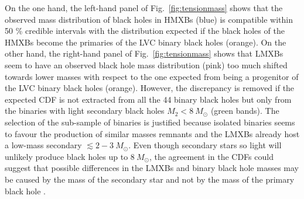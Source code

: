 \documentclass[a4paper,titlepage]{book}     	%
\newcommand{\sun}{\ensuremath{_\odot}}
\newcommand{\msun}{\ensuremath{M\sun}}
\begin{document}
On the one hand, the left-hand panel of Fig.\ \ref{fig:tensionmass} shows that the observed mass distribution of black holes in HMXBs (blue) is compatible within 50 \% credible intervals with the distribution expected if the black holes of the HMXBs become the primaries of the LVC binary black holes (orange). On the other hand, the right-hand panel of Fig.\ \ref{fig:tensionmass} shows that LMXBs seem to have an observed black hole mass distribution (pink) too much shifted towards lower masses with respect to the one expected from being a progenitor of the LVC binary black holes (orange). However, the discrepancy is removed if the expected CDF is not extracted from all the 44 binary black holes but only from the binaries with light secondary black holes $M_2 < 8~\msun$ (green bands). The selection of the sub-sample of binaries is justified because isolated binaries seems to favour the production of similar masses remnants and the LMXBs already host a low-mass secondary $\lesssim 2-3~\msun$. Even though secondary stars so light will unlikely produce black holes up to $8~\msun$, the agreement in the CDFs could suggest that possible differences in the LMXBs and binary black hole masses may be caused by the mass of the secondary star and not by the mass of the primary black hole \cite{HMXBH_spins2021}.
\end{document}
